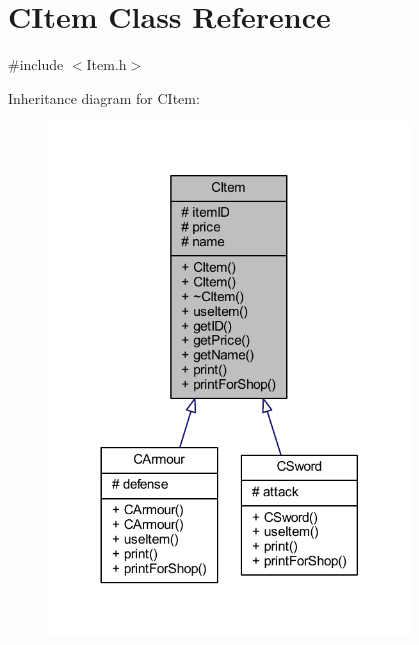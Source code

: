 \hypertarget{class_c_item}{}\section{C\+Item Class Reference}
\label{class_c_item}


{\ttfamily \#include $<$Item.\+h$>$}



Inheritance diagram for C\+Item\+:\nopagebreak
\begin{figure}[H]
\begin{center}
\leavevmode
\includegraphics[width=272pt]{class_c_item__inherit__graph}
\end{center}
\end{figure}



